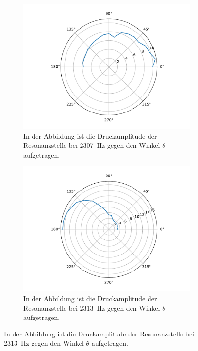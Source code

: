             \FloatBarrier
            \begin{figure}[ht]
                \centering
                \begin{subfigure}[b]{0.45\textwidth}
                    \centering
                    \includegraphics[scale=0.3]{./pictures/H_mol_resonanz_1_2307Hz.pdf}
                    \caption{In der Abbildung ist die Druckamplitude der Resonanzstelle bei \SI{2307}{\hertz} gegen den Winkel $\theta$ aufgetragen.}
                    \label{fig:H_mol_resonanz_1_2307Hz}
                \end{subfigure}
                \hfill
                \centering
                \begin{subfigure}[b]{0.45\textwidth}
                    \centering
                    \includegraphics[scale=0.3]{./pictures/H_mol_resonanz_1_2313Hz.pdf}
                    \caption{In der Abbildung ist die Druckamplitude der Resonanzstelle bei \SI{2313}{\hertz} gegen den Winkel $\theta$ aufgetragen.}
                    \label{fig:H_mol_resonanz_1_2313Hz}
                \end{subfigure}


\end{figure}
